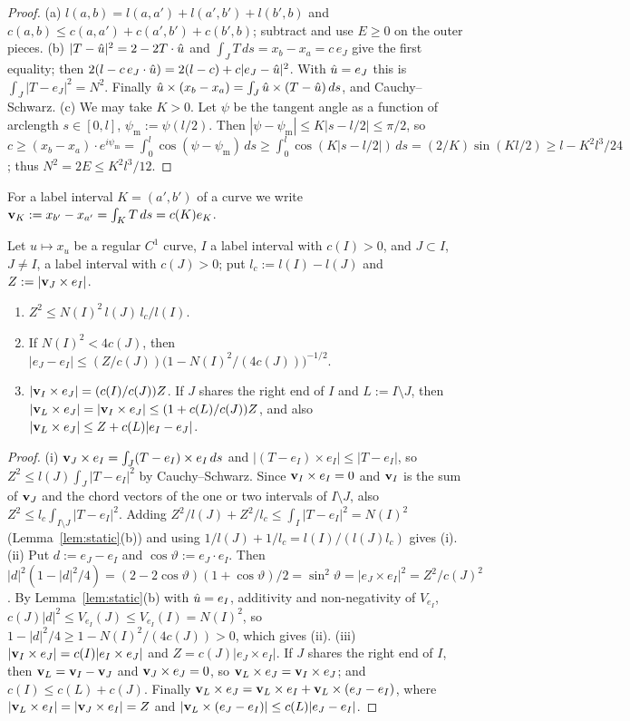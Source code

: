 \begin{proof}
(a) $l(a,b)=l(a,a')+l(a',b')+l(b',b)$ and $c(a,b)\le c(a,a')+c(a',b')+c(b',b)$; subtract and use $E\ge0$ on the outer pieces.
(b) $|T-\hat u|^2=2-2T\cdot\hat u$ and $\int_JT\,ds=x_b-x_a=c\,e_J$ give the first equality; then
$2(l-c\,e_J\cdot\hat u)=2(l-c)+c|e_J-\hat u|^2$. With $\hat u=e_J$ this is $\int_J|T-e_J|^2=N^2$. Finally
$\hat u\times(x_b-x_a)=\int_J\hat u\times(T-\hat u)\,ds$, and Cauchy--Schwarz.
(c) We may take $K>0$. Let $\psi$ be the tangent angle as a function of arclength $s\in[0,l]$, $\psi_{\mathrm m}:=\psi(l/2)$. Then
$|\psi-\psi_{\mathrm m}|\le K|s-l/2|\le\pi/2$, so
$c\ge(x_b-x_a)\cdot e^{i\psi_{\mathrm m}}=\int_0^l\cos(\psi-\psi_{\mathrm m})\,ds\ge\int_0^l\cos(K|s-l/2|)\,ds=(2/K)\sin(Kl/2)\ge l-K^2l^3/24$;
thus $N^2=2E\le K^2l^3/12$.
\end{proof}

For a label interval $K=(a',b')$ of a curve we write $\mathbf v_K:=x_{b'}-x_{a'}=\int_KT\,ds=c(K)e_K$.

\begin{lemma}\label{lem:split}
Let $u\mapsto x_u$ be a regular $C^1$ curve, $I$ a label interval with $c(I)>0$, and $J\subset I$, $J\ne I$, a label interval
with $c(J)>0$; put $l_c:=l(I)-l(J)$ and $Z:=|\mathbf v_J\times e_I|$.
\begin{enumerate}
\item[(i)] $Z^2\le N(I)^2\,l(J)\,l_c/l(I)$.
\item[(ii)] If $N(I)^2<4c(J)$, then $|e_J-e_I|\le(Z/c(J))\bigl(1-N(I)^2/(4c(J))\bigr)^{-1/2}$.
\item[(iii)] $|\mathbf v_I\times e_J|=(c(I)/c(J))Z$. If $J$ shares the right end of $I$ and $L:=I\setminus J$, then
$|\mathbf v_L\times e_J|=|\mathbf v_I\times e_J|\le(1+c(L)/c(J))Z$, and also $|\mathbf v_L\times e_J|\le Z+c(L)|e_I-e_J|$.
\end{enumerate}
\end{lemma}

\begin{proof}
(i) $\mathbf v_J\times e_I=\int_J(T-e_I)\times e_I\,ds$ and $|(T-e_I)\times e_I|\le|T-e_I|$, so $Z^2\le l(J)\int_J|T-e_I|^2$ by
Cauchy--Schwarz. Since $\mathbf v_I\times e_I=0$ and $\mathbf v_I$ is the sum of $\mathbf v_J$ and the chord vectors of the one or two intervals of
$I\setminus J$, also $Z^2\le l_c\int_{I\setminus J}|T-e_I|^2$. Adding $Z^2/l(J)+Z^2/l_c\le\int_I|T-e_I|^2=N(I)^2$
(Lemma~\ref{lem:static}(b)) and using $1/l(J)+1/l_c=l(I)/(l(J)l_c)$ gives (i).
(ii) Put $d:=e_J-e_I$ and $\cos\vartheta:=e_J\cdot e_I$. Then $|d|^2(1-|d|^2/4)=(2-2\cos\vartheta)(1+\cos\vartheta)/2=\sin^2\vartheta=
|e_J\times e_I|^2=Z^2/c(J)^2$. By Lemma~\ref{lem:static}(b) with $\hat u=e_I$, additivity and non-negativity of $V_{e_I}$,
$c(J)|d|^2\le V_{e_I}(J)\le V_{e_I}(I)=N(I)^2$, so $1-|d|^2/4\ge1-N(I)^2/(4c(J))>0$, which gives (ii).
(iii) $|\mathbf v_I\times e_J|=c(I)|e_I\times e_J|$ and $Z=c(J)|e_J\times e_I|$. If $J$ shares the right end of $I$, then
$\mathbf v_L=\mathbf v_I-\mathbf v_J$ and $\mathbf v_J\times e_J=0$, so $\mathbf v_L\times e_J=\mathbf v_I\times e_J$; and $c(I)\le c(L)+c(J)$. Finally
$\mathbf v_L\times e_J=\mathbf v_L\times e_I+\mathbf v_L\times(e_J-e_I)$, where $|\mathbf v_L\times e_I|=|\mathbf v_J\times e_I|=Z$ and
$|\mathbf v_L\times(e_J-e_I)|\le c(L)|e_J-e_I|$.
\end{proof}

